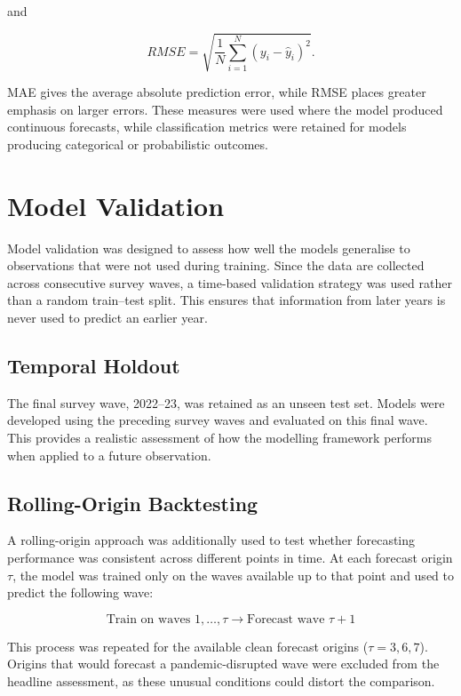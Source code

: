 \documentclass[ %
                    author={Ashrey Ashrey, Sanya Kapoor, Trisha Sharma, Yash Bhooshan Pandloskar},
                supervisor={Dr. Dalila O’Grady},
                    degree={MSc},
                     title={Using machine learning to forecast physical activity participation, volunteering and activity patterns in London},
                  subtitle={},
                      type={},
                      year={2021}]{dissertation}
\begin{document}
and

\[
RMSE =
\sqrt{
\frac{1}{N}
\sum_{i=1}^{N}
(y_i-\widehat{y}_i)^2
}.
\]

MAE gives the average absolute prediction error, while RMSE places greater emphasis on larger errors. These measures were used where the model produced continuous forecasts, while classification metrics were retained for models producing categorical or probabilistic outcomes.

\FloatBarrier
\section{Model Validation}

\noindent
Model validation was designed to assess how well the models generalise to observations that were not used during training. Since the data are collected across consecutive survey waves, a time-based validation strategy was used rather than a random train--test split. This ensures that information from later years is never used to predict an earlier year.

\FloatBarrier
\subsection{Temporal Holdout}

\noindent
The final survey wave, 2022--23, was retained as an unseen test set. Models were developed using the preceding survey waves and evaluated on this final wave. This provides a realistic assessment of how the modelling framework performs when applied to a future observation.

\FloatBarrier
\subsection{Rolling-Origin Backtesting}

\noindent
A rolling-origin approach was additionally used to test whether forecasting performance was consistent across different points in time. At each forecast origin \(\tau\), the model was trained only on the waves available up to that point and used to predict the following wave:

\[
\text{Train on waves }1,\ldots,\tau
\rightarrow
\text{Forecast wave }\tau+1
\]

This process was repeated for the available clean forecast origins (\(\tau=3,6,7\)). Origins that would forecast a pandemic-disrupted wave were excluded from the headline assessment, as these unusual conditions could distort the comparison.
\end{document}
